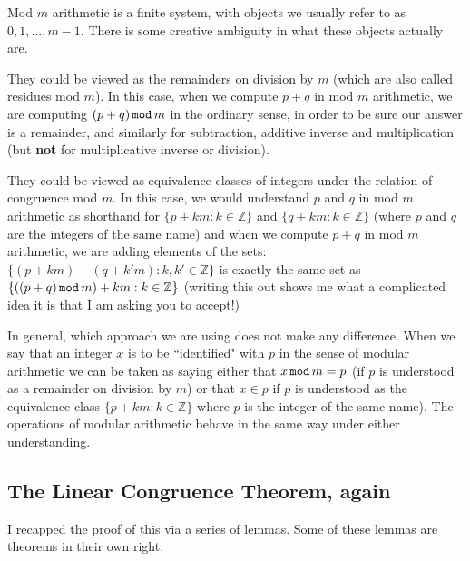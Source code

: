 \documentclass[12pt]{article}
\begin{document}
Mod $m$ arithmetic is a finite system, with objects we usually refer to as $0,1,\ldots,m-1$.  There is some creative ambiguity in what these objects actually are.

They could be viewed as the remainders on division by $m$ (which are also called residues mod $m$).  In this case, when we compute
$p+q$ in mod $m$ arithmetic, we are computing $(p+q) \,{\tt mod}\, m$ in the ordinary sense, in order to be sure our answer is a remainder, and similarly for subtraction, additive inverse and multiplication (but {\bf not} for multiplicative inverse or division).

They could be viewed as equivalence classes of integers under the relation of congruence mod $m$.  In this case, we would understand $p$ and $q$ in mod $m$ arithmetic as shorthand for $\{p+km:k \in {\mathbb Z}\}$  and $\{q+km:k \in {\mathbb Z}\}$ (where $p$ and $q$ are the integers of the  same name)
and when we compute $p+q$ in mod $m$ arithmetic, we are adding elements of the sets:  $\{(p+km) + (q+k'm):k, k' \in {\mathbb Z}\}$ is exactly the same set
as $\{((p+q) \,{\tt mod}\,m)+km:k \in {\mathbb Z}\}$ (writing this out shows me what a complicated idea it is that I am asking you to accept!)

In general, which approach we are using does not make any difference.  When we say that an integer $x$ is to be ``identified" with $p$ in the sense of modular arithmetic
we can be taken as saying either that $x \,{\tt mod}\,m = p$ (if $p$ is understood as a remainder on division by $m$) or that $x \in p$ if $p$ is understood as the equivalence class $\{p+km:k \in {\mathbb Z}\}$ where $p$ is the integer of the same name).  The operations of modular arithmetic behave in the same way under either understanding.
\newpage
\subsection{The Linear Congruence Theorem, again}

I recapped the proof of this via a series of lemmas.  Some of these lemmas are theorems in their own right.
\end{document}
